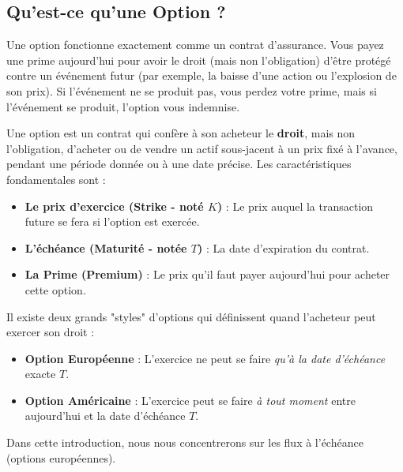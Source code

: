 \subsection{Qu'est-ce qu'une Option ?}

\begin{intuitionbox}
Une option fonctionne exactement comme un contrat d'assurance. Vous payez une prime aujourd'hui pour avoir le droit (mais non l'obligation) d'être protégé contre un événement futur (par exemple, la baisse d'une action ou l'explosion de son prix). Si l'événement ne se produit pas, vous perdez votre prime, mais si l'événement se produit, l'option vous indemnise.
\end{intuitionbox}

\begin{definitionbox}
Une option est un contrat qui confère à son acheteur le \textbf{droit}, mais non l'obligation, d'acheter ou de vendre un actif sous-jacent à un prix fixé à l'avance, pendant une période donnée ou à une date précise.
Les caractéristiques fondamentales sont :
\begin{itemize}[label=$\rightarrow$]
    \item \textbf{Le prix d'exercice (Strike - noté $K$)} : Le prix auquel la transaction future se fera si l'option est exercée.
    \item \textbf{L'échéance (Maturité - notée $T$)} : La date d'expiration du contrat.
    \item \textbf{La Prime (Premium)} : Le prix qu'il faut payer aujourd'hui pour acheter cette option.
\end{itemize}
\end{definitionbox}

\begin{remarquebox}
Il existe deux grands "styles" d'options qui définissent quand l'acheteur peut exercer son droit :
\begin{itemize}[label=$\cdot$]
    \item \textbf{Option Européenne} : L'exercice ne peut se faire \textit{qu'à la date d'échéance} exacte $T$.
    \item \textbf{Option Américaine} : L'exercice peut se faire \textit{à tout moment} entre aujourd'hui et la date d'échéance $T$.
\end{itemize}
Dans cette introduction, nous nous concentrerons sur les flux à l'échéance (options européennes).
\end{remarquebox}

